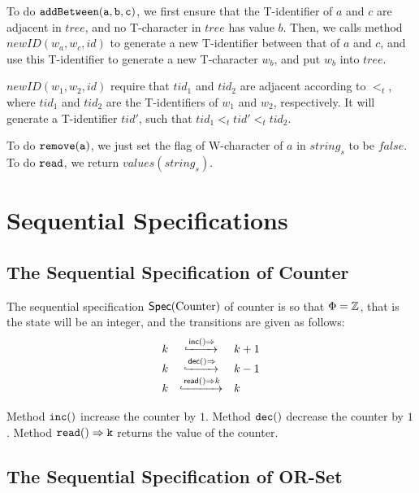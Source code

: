 To do $\alabelshort[{\tt addBetween}]{a,b,c}$, we first ensure that the T-identifier of $a$ and $c$ are adjacent in $tree$, and no T-character in $tree$ has value $b$. Then, we calls method $newID(w_a,w_c,id)$ to generate a new T-identifier between that of $a$ and $c$, and use this T-identifier to generate a new T-character $w_b$, and put $w_b$ into $tree$.

$newID(w_1,w_2,id)$ require that $tid_1$ and $tid_2$ are adjacent according to $<_t$, where $tid_1$ and $tid_2$ are the T-identifiers of $w_1$ and $w_2$, respectively. It will generate a T-identifier $tid'$, such that $tid_1 <_t tid' <_t tid_2$.

To do $\alabelshort[{\tt remove}]{a}$, we just set the flag of W-character of $a$ in $string_s$ to be $\mathit{false}$. To do ${\tt read}$, we return $values(string_s)$.







\section{Sequential Specifications}
\label{sec:sequential specifications}



\subsection{The Sequential Specification of Counter}
\label{subsec:the sequential specification of counter}

The sequential specification $\specCounter$ of counter is so that $\abstates = \mathbb{Z}$, that is the state will be an integer, and the transitions are given as follows:
\[
  \begin{array}[rcl]{rcl}
    k & \specarrow{\alabellong[\mathsf{inc}]{}{}} & k+1\\
    k & \specarrow{\alabellong[\mathsf{dec}]{}{}} & k-1\\
    k & \specarrow{\alabellong[\mathsf{read}]{}{k}} & k
  \end{array}
\]

Method $\alabelshort[{\tt inc}]{}$ increase the counter by $1$. Method $\alabelshort[{\tt dec}]{}$ decrease the counter by $1$. Method $\alabellong[{\tt read}]{}{k}{}$ returns the value of the counter.



\subsection{The Sequential Specification of OR-Set}
\label{subsec:the sequential specification of or-set}


